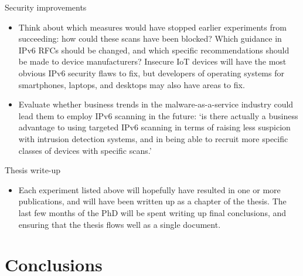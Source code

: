 \documentclass[10pt,sigconf]{acmart}
\begin{document}
Security improvements
\begin{itemize}
	\item Think about which measures would have stopped earlier experiments from succeeding:
	how could these scans have been blocked?
	Which guidance in IPv6 RFCs should be changed, and which specific recommendations should be made to device manufacturers?
	Insecure IoT devices will have the most obvious IPv6 security flaws to fix, but developers of operating systems for smartphones, laptops, and desktops may also have areas to fix.
	\item Evaluate whether business trends in the malware-as-a-service industry could lead them to employ IPv6 scanning in the future:
	`is there actually a business advantage to using targeted IPv6 scanning in terms of raising less suspicion with intrusion detection systems, and in being able to recruit more specific classes of devices with specific scans.'
\end{itemize}

Thesis write-up
\begin{itemize}
	\item Each experiment listed above will hopefully have resulted in one or more publications, and will have been written up as a chapter of the thesis.
	The last few months of the PhD will be spent writing up final conclusions, and ensuring that the thesis flows well as a single document.
\end{itemize}


\section{Conclusions}


%





\ifpdf
  \ifdefined\pdftrailerid
    \pdftrailerid{}
  \fi
\fi
\end{document}
